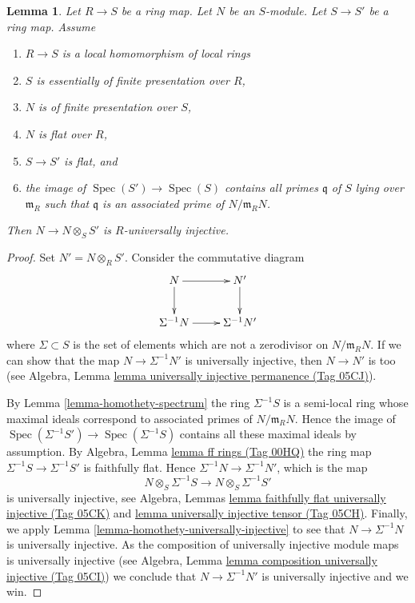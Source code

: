 \documentclass{amsart}
\theoremstyle{plain}
\newtheorem{lemma}[subsection]{Lemma}
\theoremstyle{definition}
\theoremstyle{remark}
\numberwithin{equation}{subsection}
\def\Spec{\mathop{\mathrm{Spec}}}
\begin{document}
\begin{lemma}
\label{lemma-base-change-universally-flat-local}
Let $R \to S$ be a ring map.
Let $N$ be an $S$-module.
Let $S \to S'$ be a ring map.
Assume
\begin{enumerate}
\item $R \to S$ is a local homomorphism of local rings
\item $S$ is essentially of finite presentation over $R$,
\item $N$ is of finite presentation over $S$,
\item $N$ is flat over $R$,
\item $S \to S'$ is flat, and
\item the image of $\Spec(S') \to \Spec(S)$ contains
all primes $\mathfrak q$ of $S$ lying over $\mathfrak m_R$
such that $\mathfrak q$ is an associated prime of $N/\mathfrak m_R N$.
\end{enumerate}
Then $N \to N \otimes_S S'$ is $R$-universally injective.
\end{lemma}

\begin{proof}
Set $N' = N \otimes_R S'$. Consider the commutative diagram
$$
\xymatrix{
N \ar[d] \ar[r] & N' \ar[d] \\
\Sigma^{-1}N \ar[r] & \Sigma^{-1}N'
}
$$
where $\Sigma \subset S$ is the set of elements which are not a
zerodivisor on $N/\mathfrak m_R N$. If we can show that the map
$N \to \Sigma^{-1}N'$ is universally injective, then $N \to N'$
is too (see
Algebra, Lemma \href{https://stacks.math.columbia.edu/tag/05CJ}{lemma universally injective permanence (Tag 05CJ)}).

\medskip\noindent
By
Lemma \ref{lemma-homothety-spectrum}
the ring $\Sigma^{-1}S$ is a semi-local ring whose maximal ideals
correspond to associated primes of $N/\mathfrak m_R N$.
Hence the image of
$\Spec(\Sigma^{-1}S') \to \Spec(\Sigma^{-1}S)$
contains all these maximal ideals by assumption. By
Algebra, Lemma \href{https://stacks.math.columbia.edu/tag/00HQ}{lemma ff rings (Tag 00HQ)}
the ring map $\Sigma^{-1}S \to \Sigma^{-1}S'$ is faithfully flat.
Hence $\Sigma^{-1}N \to \Sigma^{-1}N'$, which is the map
$$
N \otimes_S \Sigma^{-1}S \longrightarrow N \otimes_S \Sigma^{-1}S'
$$
is universally injective, see
Algebra, Lemmas \href{https://stacks.math.columbia.edu/tag/05CK}{lemma faithfully flat universally injective (Tag 05CK)} and
\href{https://stacks.math.columbia.edu/tag/05CH}{lemma universally injective tensor (Tag 05CH)}.
Finally, we apply
Lemma \ref{lemma-homothety-universally-injective}
to see that $N \to \Sigma^{-1}N$ is universally injective.
As the composition of universally injective module maps is universally
injective (see
Algebra, Lemma \href{https://stacks.math.columbia.edu/tag/05CI}{lemma composition universally injective (Tag 05CI)})
we conclude that $N \to \Sigma^{-1}N'$ is universally injective and we win.
\end{proof}
\end{document}
